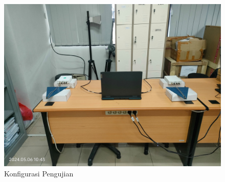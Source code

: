 \begin{figure}
	\begin{center}
		\includegraphics[scale=0.09]{pics/bab3/konfigurasiPengujian.jpg}
		\caption{Konfigurasi Pengujian}
		\label{img:konfigurasi}
	\end{center}
\end{figure}

